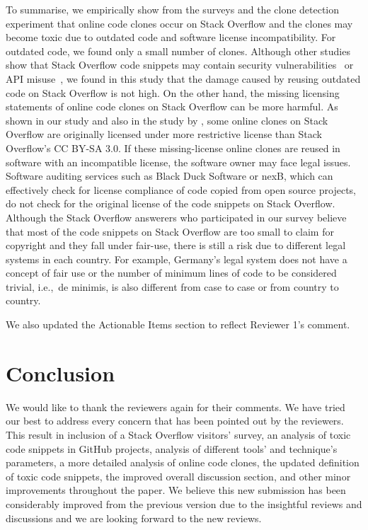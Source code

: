 \documentclass[a4paper,twoside,10pt]{reviewresponse}
\begin{document}
To summarise, we empirically show from the surveys and the clone detection
experiment that online code clones occur on Stack Overflow and the clones may
become toxic due to outdated code and software license incompatibility. For
outdated code, we found only a small number of clones. Although other studies
show that Stack Overflow code snippets may contain security
vulnerabilities~\citep{Acar2016,Fischer2017} or API misuse~\citep{Zhang2018}, we
found in this study that the damage caused by reusing outdated code on Stack
Overflow is not high. On the other hand, the missing licensing statements of
online code clones on Stack Overflow can be more harmful. As shown in our study
and also in the study by \cite{An2017}, some online clones on Stack Overflow are
originally licensed under more restrictive license than Stack Overflow's CC
BY-SA 3.0. If these missing-license online clones are reused in software with
an incompatible license, the software owner may face legal issues. Software
auditing services such as Black Duck Software or nexB, which can effectively
check for license compliance of code copied from open source projects, do not
check for the original license of the code snippets on Stack Overflow. Although
the Stack Overflow answerers who participated in our survey believe that most of
the code snippets on Stack Overflow are too small to claim for copyright and
they fall under fair-use, there is still a risk due to different legal systems
in each country. For example, Germany's legal system does not have a concept of
fair use or the number of minimum lines of code to be considered trivial,
i.e.,~de minimis, is also different from case to case or from country to country.

We also updated the Actionable Items section to reflect Reviewer 1's comment.

\vspace{1cm}

\section{Conclusion}
We would like to thank the reviewers again for their comments.
We have tried our best to address every concern that has been pointed out by the reviewers. This result in inclusion of a Stack Overflow visitors' survey, an analysis of toxic code snippets in GitHub projects, analysis of different tools' and technique's parameters, a more detailed analysis of online code clones, the updated definition of toxic code snippets, the improved overall discussion section, and other minor improvements throughout the paper.
We believe this new submission has been considerably improved from the previous version due to the insightful reviews and discussions and we are looking forward to the new reviews.

%


\end{document}
